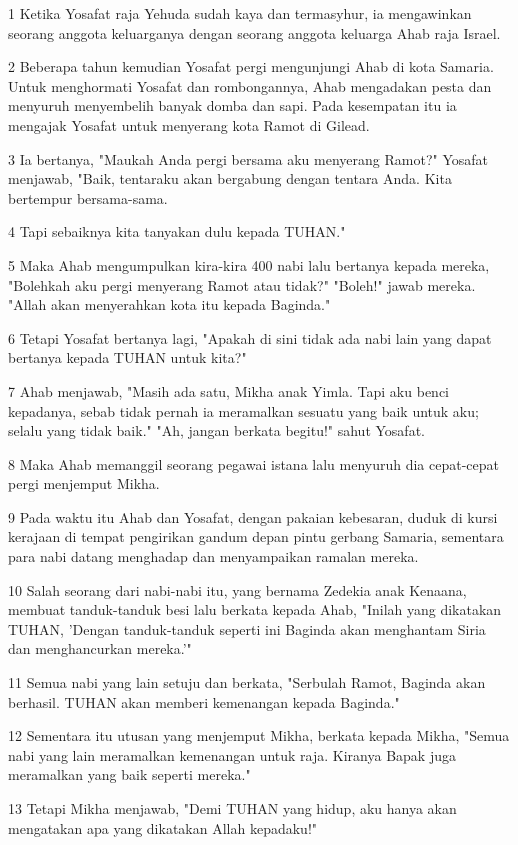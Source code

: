 \par 1 Ketika Yosafat raja Yehuda sudah kaya dan termasyhur, ia mengawinkan seorang anggota keluarganya dengan seorang anggota keluarga Ahab raja Israel.
\par 2 Beberapa tahun kemudian Yosafat pergi mengunjungi Ahab di kota Samaria. Untuk menghormati Yosafat dan rombongannya, Ahab mengadakan pesta dan menyuruh menyembelih banyak domba dan sapi. Pada kesempatan itu ia mengajak Yosafat untuk menyerang kota Ramot di Gilead.
\par 3 Ia bertanya, "Maukah Anda pergi bersama aku menyerang Ramot?" Yosafat menjawab, "Baik, tentaraku akan bergabung dengan tentara Anda. Kita bertempur bersama-sama.
\par 4 Tapi sebaiknya kita tanyakan dulu kepada TUHAN."
\par 5 Maka Ahab mengumpulkan kira-kira 400 nabi lalu bertanya kepada mereka, "Bolehkah aku pergi menyerang Ramot atau tidak?" "Boleh!" jawab mereka. "Allah akan menyerahkan kota itu kepada Baginda."
\par 6 Tetapi Yosafat bertanya lagi, "Apakah di sini tidak ada nabi lain yang dapat bertanya kepada TUHAN untuk kita?"
\par 7 Ahab menjawab, "Masih ada satu, Mikha anak Yimla. Tapi aku benci kepadanya, sebab tidak pernah ia meramalkan sesuatu yang baik untuk aku; selalu yang tidak baik." "Ah, jangan berkata begitu!" sahut Yosafat.
\par 8 Maka Ahab memanggil seorang pegawai istana lalu menyuruh dia cepat-cepat pergi menjemput Mikha.
\par 9 Pada waktu itu Ahab dan Yosafat, dengan pakaian kebesaran, duduk di kursi kerajaan di tempat pengirikan gandum depan pintu gerbang Samaria, sementara para nabi datang menghadap dan menyampaikan ramalan mereka.
\par 10 Salah seorang dari nabi-nabi itu, yang bernama Zedekia anak Kenaana, membuat tanduk-tanduk besi lalu berkata kepada Ahab, "Inilah yang dikatakan TUHAN, 'Dengan tanduk-tanduk seperti ini Baginda akan menghantam Siria dan menghancurkan mereka.'"
\par 11 Semua nabi yang lain setuju dan berkata, "Serbulah Ramot, Baginda akan berhasil. TUHAN akan memberi kemenangan kepada Baginda."
\par 12 Sementara itu utusan yang menjemput Mikha, berkata kepada Mikha, "Semua nabi yang lain meramalkan kemenangan untuk raja. Kiranya Bapak juga meramalkan yang baik seperti mereka."
\par 13 Tetapi Mikha menjawab, "Demi TUHAN yang hidup, aku hanya akan mengatakan apa yang dikatakan Allah kepadaku!"
